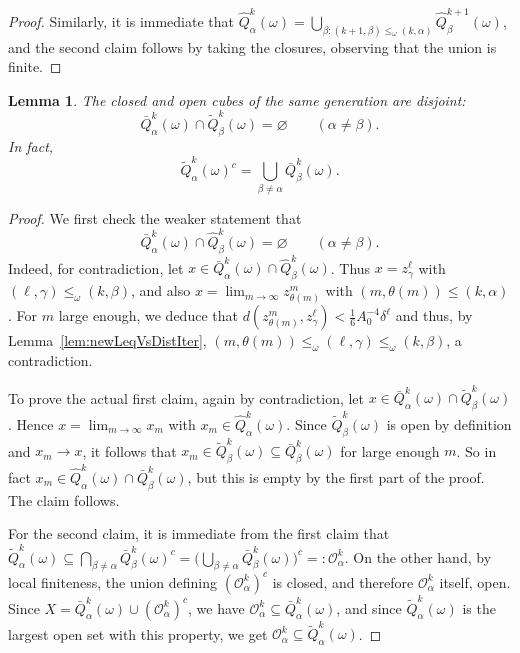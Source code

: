 \documentclass{amsart}
\numberwithin{equation}{section}
\theoremstyle{plain}
\newtheorem{lemma}[equation]{Lemma}
\theoremstyle{definition}
\theoremstyle{remark}
\begin{document}
{{\begin{proof}
Similarly, it is immediate that $\hat{Q}^k_\alpha(\omega)=\bigcup_{\beta:(k+1,\beta)\leq_\omega(k,\alpha)}\hat{Q}^{k+1}_\beta(\omega)$, and the second claim follows by taking the closures, observing that the union is finite.
\end{proof}

\begin{lemma}
The closed and open cubes of the same generation are disjoint:
\begin{equation*}
  \bar{Q}^k_{\alpha}(\omega)\cap\tilde{Q}^k_{\beta}(\omega)=\varnothing\qquad(\alpha\neq\beta).
\end{equation*}
In fact,
\begin{equation*}
  \tilde{Q}^k_\alpha(\omega)^c=\bigcup_{\beta\neq\alpha}\bar{Q}^k_\beta(\omega).
\end{equation*}
\end{lemma}

\begin{proof}
We first check the weaker statement that
\begin{equation*}
   \bar{Q}^k_{\alpha}(\omega)\cap\hat{Q}^k_{\beta}(\omega)=\varnothing\qquad(\alpha\neq\beta).
\end{equation*}
Indeed, for contradiction, let $x\in\bar{Q}^k_{\alpha}(\omega)\cap\hat{Q}^k_{\beta}(\omega)$. Thus $x=z^\ell_\gamma$ with $(\ell,\gamma)\leq_\omega(k,\beta)$, and also $x=\lim_{m\to\infty}z^m_{\theta(m)}$ with $(m,\theta(m))\leq(k,\alpha)$. For $m$ large enough, we deduce that $d(z^m_{\theta(m)},z^\ell_\gamma)<\tfrac16A_0^{-4}\delta^\ell$ and thus, by Lemma~\ref{lem:newLeqVsDistIter}, $(m,\theta(m))\leq_\omega(\ell,\gamma)\leq_\omega(k,\beta)$, a contradiction.

To prove the actual first claim, again by contradiction, let $x\in \bar{Q}^k_{\alpha}(\omega)\cap\tilde{Q}^k_{\beta}(\omega)$. Hence $x=\lim_{m\to\infty}x_m$ with $x_m\in\hat{Q}^k_\alpha(\omega)$. Since $\tilde{Q}^k_{\beta}(\omega)$ is open by definition and $x_m\to x$, it follows that $x_m\in\tilde{Q}^k_\beta(\omega)\subseteq\bar{Q}^k_\beta(\omega)$ for large enough $m$. So in fact $x_m\in\hat{Q}^k_\alpha(\omega)\cap\bar{Q}^k_\beta(\omega)$, but this is empty by the first part of the proof. The claim follows.

For the second claim, it is immediate from the first claim that $\tilde{Q}^k_\alpha(\omega)\subseteq\bigcap_{\beta\neq\alpha}\bar{Q}^k_\beta(\omega)^c=\Big(\bigcup_{\beta\neq\alpha}\bar{Q}^k_\beta(\omega)\Big)^c=:\mathscr{O}^k_\alpha$. On the other hand, by local finiteness, the union defining $(\mathscr{O}^k_\alpha)^c$ is closed, and therefore $\mathscr{O}^k_\alpha$ itself, open. Since $X=\bar{Q}^k_\alpha(\omega)\cup(\mathscr{O}^k_\alpha)^c$, we have $\mathscr{O}^k_\alpha\subseteq\bar{Q}^k_\alpha(\omega)$, and since $\tilde{Q}^k_\alpha(\omega)$ is the largest open set with this property, we get $\mathscr{O}^k_\alpha\subseteq\tilde{Q}^k_\alpha(\omega)$.
\end{proof}

}}
\end{document}
